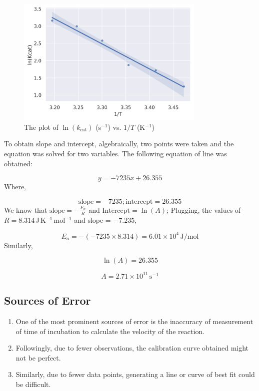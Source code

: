 \documentclass[pdflatex,sn-mathphys]{sn-jnl}%
\theoremstyle{thmstyleone}%
\theoremstyle{thmstyletwo}%
\theoremstyle{thmstylethree}%
\begin{document}
\begin{figure}[h]
  \centering
  \includegraphics[width=0.8\textwidth]{photos/ln_graph.png}
  \caption{The plot of $\ln(k_{\text{cat}})$ (s$^{-1}$) vs. $1/T$ (K$^{-1}$)}\label{fig3_}
\end{figure}

To obtain slope and intercept, algebraically, two points were taken and the
equation was solved for two variables. The following equation of line was
obtained:

\[y = -7235x + 26.355\]
Where,

\[\text{slope} = -7235; \text{intercept} = 26.355\]
We know that $\text{slope} = -\frac{E_a}{R}$ and $\text{Intercept} = \ln(A)$;
Plugging, the values of $R = 8.314$\,J\,K$^{-1}$\,mol$^{-1}$ and slope =
$-7.235$,

\[E_a = -(-7235 \times 8.314) = 6.01 \times 10^4\,\text{J/mol}\]
Similarly,

\[\ln(A) = 26.355\]

\[A = 2.71 \times 10^{11}\,\text{s}^{-1}\]

\subsection{Sources of Error}\label{subsec2}
\begin{enumerate}
  \item One of the most prominent sources of error is the inaccuracy of measurement of
        time of incubation to calculate the velocity of the reaction.
  \item Followingly, due to fewer observations, the calibration curve obtained might
        not be perfect.
  \item Similarly, due to fewer data points, generating a line or curve of best fit
        could be difficult.
\end{enumerate}
\end{document}
